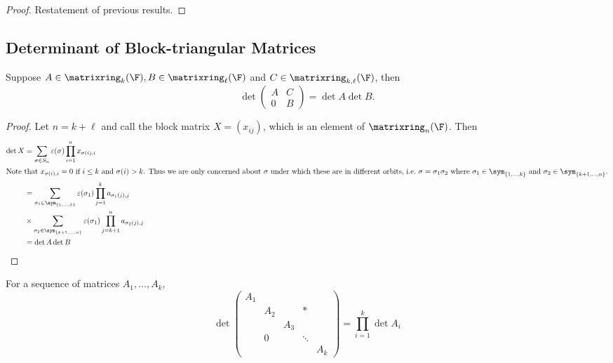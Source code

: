 \documentclass[a4paper]{article}
\newcommand*{\M}{\matrixring}
\theoremstyle{definition}
\begin{document}
\begin{proof}
  Restatement of previous results.
\end{proof}

\subsection{Determinant of Block-triangular Matrices}

\begin{lemma}
  Suppose \(A \in \M_k(\F), B \in \M_\ell(\F)\) and \(C \in \M_{k, \ell}(\F)\), then
  \[
    \det
    \begin{pmatrix}
      A & C \\
      0 & B
    \end{pmatrix}
    = \det A \det B.
  \]
\end{lemma}

\begin{proof}
  Let \(n = k + \ell\) and call the block matrix \(X = (x_{ij})\), which is an element of \(\M_n(\F)\). Then
  \begin{align*}
    \det X &= \sum_{\sigma \in S_n}^{ }\varepsilon(\sigma) \prod_{i = 1}^{n} x_{\sigma(i), i} \\
    \intertext{Note that \(x_{\sigma(i), i} = 0\) if \(i \leq k\) and \(\sigma(i) > k\). Thus we are only concerned about \(\sigma\) under which these are in different orbits, i.e.\ \(\sigma = \sigma_1\sigma_2\) where \(\sigma_1 \in \sym_{\{1,\dots, k\}}\) and \(\sigma_2 \in \sym_{\{k+1, \dots, n\}}\).}
           &= \sum_{\sigma_1 \in \sym_{\{1, \dots, k\}}}^{ } \varepsilon(\sigma_1) \prod_{j = 1}^{k} a_{\sigma_1(j),j} \\
           &\times \sum_{\sigma_2 \in \sym_{\{k+1, \dots, n\}}}^{ } \varepsilon(\sigma_1) \prod_{j = k + 1}^{n} a_{\sigma_2(j),j} \\
           &= \det A \det B
  \end{align*}
\end{proof}

\begin{corollary}
  For a sequence of matrices \(A_1, \dots, A_k\),
  \[
    \det
    \begin{pmatrix}
      A_1 & & & & \\
      & A_2 & & * & \\
      & & A_3 & & \\
      & 0 & & \ddots & \\
      & & & & A_k
    \end{pmatrix}
    = \prod_{i = 1}^{k} \det A_i
  \]
\end{corollary}
\end{document}

